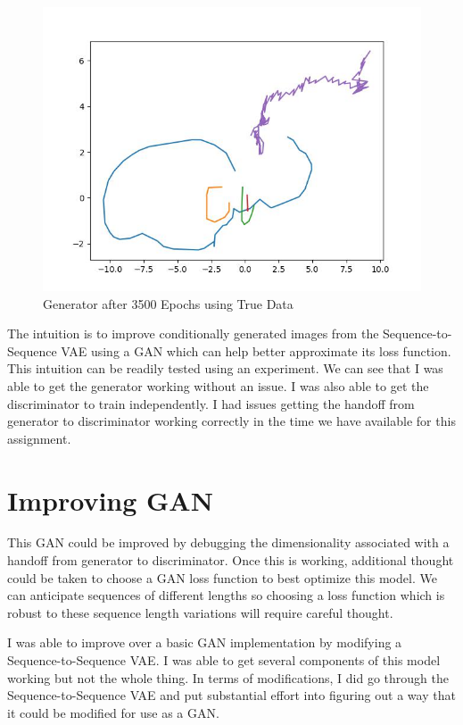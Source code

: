 \documentclass[a4paper,12pt]{article} %
\begin{document}
\begin{figure}[h]
  \begin{center}
    \includegraphics[scale=0.5]{3400_output_}
    \caption{Generator after 3500 Epochs using True Data}
    \label{fig:gen3500}
    \end{center}
\end{figure}

The intuition is to improve conditionally generated images from the
Sequence-to-Sequence VAE using a GAN which can help better approximate
its loss function. This intuition can be readily tested using an experiment.
We can see that I was able to get the generator working without an issue. I
was also able to get the discriminator to train independently. I had issues
getting the handoff from generator to discriminator working correctly in the
time we have available for this assignment.

\section{Improving GAN}

This GAN could be improved by debugging the dimensionality associated with
a handoff from generator to discriminator. Once this is working, additional
thought could be taken to choose a GAN loss function to best optimize this
model. We can anticipate sequences of different lengths so choosing a
loss function which is robust to these sequence length variations will require
careful thought.\newline

I was able to improve over a basic GAN implementation by modifying a
Sequence-to-Sequence VAE. I was able to get several components of this model
working but not the whole thing. In terms of modifications, I did go
through the Sequence-to-Sequence VAE and put substantial effort into
figuring out a way that it could be modified for use as a GAN.




\end{document}
